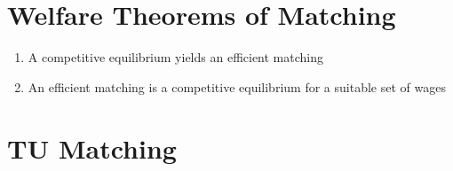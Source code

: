 \documentclass{article}
\begin{document}

\section*{Welfare Theorems of Matching}

\begin{enumerate}
	\item A competitive equilibrium yields an efficient matching
	
	\item An efficient matching is a competitive equilibrium for a suitable set of wages
\end{enumerate}





\section*{TU Matching}
\end{document}
